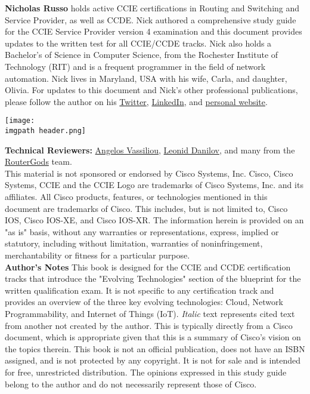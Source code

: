 \noindent
\textbf{Nicholas Russo} holds active CCIE certifications in Routing and
Switching and Service Provider, as well as CCDE. Nick authored a comprehensive
study guide for the CCIE Service Provider version 4 examination and this
document provides updates to the written test for all CCIE/CCDE tracks. Nick
also holds a Bachelor’s of Science in Computer Science, from the Rochester
Institute of Technology (RIT) and is a frequent programmer in the field of
network automation. Nick lives in Maryland, USA with his wife, Carla, and
daughter, Olivia. For updates to this document and Nick’s other professional
publications, please follow the author on his
\href{https://twitter.com/nickrusso42518}{Twitter},
\href{https://www.linkedin.com/in/njrusmc}{LinkedIn}, and
\href{http://njrusmc.net}{personal website}. \\

    \begin{minipage}[t]{\linewidth}
	  \centering
      \texttt{[image: \\imgpath header.png]}
    \end{minipage}

\textbf{Technical Reviewers:}
\href{https://twitter.com/ipmess}{Angelos Vassiliou},
\href{https://twitter.com/iosxrqna}{Leonid Danilov}, and many from the
\href{https://www.meetup.com/routergods}{RouterGods} team. \\

This material is not sponsored or endorsed by Cisco Systems, Inc. Cisco, Cisco
Systems, CCIE and the CCIE Logo are trademarks of Cisco Systems, Inc. and its
affiliates. All Cisco products, features, or technologies mentioned in this
document are trademarks of Cisco. This includes, but is not limited to, Cisco
IOS, Cisco IOS-XE, and Cisco IOS-XR. The information herein is provided on an
"as is" basis, without any warranties or representations, express, implied or
statutory, including without limitation, warranties of noninfringement,
merchantability or fitness for a particular purpose. \\

\textbf{Author’s Notes}
This book is designed for the CCIE and CCDE certification tracks that
introduce the "Evolving Technologies" section of the blueprint for the written
qualification exam. It is not specific to any certification track and provides
an overview of the three key evolving technologies: Cloud, Network
Programmability, and Internet of Things (IoT). \textit{Italic} text represents
cited text from another not created by the author. This is typically directly
from a Cisco document, which is appropriate given that this is a summary of
Cisco’s vision on the topics therein. This book is not an official
publication, does not have an ISBN assigned, and is not protected by any
copyright. It is not for sale and is intended for free, unrestricted
distribution. The opinions expressed in this study guide belong to the author
and do not necessarily represent those of Cisco. \\

